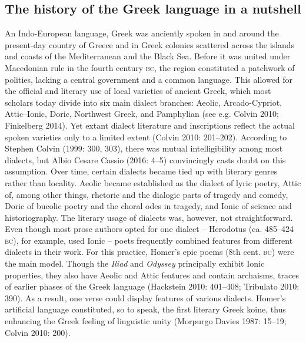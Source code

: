 \subsection{The history of the Greek language in a nutshell}
\hypertarget{Toc19704803}{}\begin{styleStandard}
An Indo-European language, Greek was anciently spoken in and around the present-day country of Greece and in Greek colonies scattered across the islands and coasts of the Mediterranean and the Black Sea. Before it was united under Macedonian rule in the fourth century \textsc{bc}, the region constituted a patchwork of polities, lacking a central government and a common language. This allowed for the official and literary use of local varieties of ancient Greek, which most scholars today divide into six main dialect branches: Aeolic, Arcado-Cypriot, Attic–Ionic, Doric, Northwest Greek, and Pamphylian (see e.g. Colvin 2010; Finkelberg 2014). Yet extant dialect literature and inscriptions reflect the actual spoken varieties only to a limited extent (Colvin 2010: 201–202). According to Stephen Colvin (1999: 300, 303), there was mutual intelligibility among most dialects, but Albio Cesare Cassio (2016: 4–5) convincingly casts doubt on this assumption. Over time, certain dialects became tied up with literary genres rather than locality. Aeolic became established as the dialect of lyric poetry, Attic of, among other things, rhetoric and the dialogic parts of tragedy and comedy, Doric of bucolic poetry and the choral odes in tragedy, and Ionic of science and historiography. The literary usage of dialects was, however, not straightforward. Even though most prose authors opted for one dialect – Herodotus (ca. 485–424 \textsc{bc}), for example, used Ionic – poets frequently combined features from different dialects in their work. For this practice, Homer’s epic poems (8th cent. \textsc{bc}) were the main model. Though the \textit{Iliad} and \textit{Odyssey} principally exhibit Ionic properties, they also have Aeolic and Attic features and contain archaisms, traces of earlier phases of the Greek language (Hackstein 2010: 401–408; Tribulato 2010: 390). As a result, one verse could display features of various dialects. Homer’s artificial language\textit{ }constituted, so to speak, the first literary Greek koine, thus enhancing the Greek feeling of linguistic unity (Morpurgo Davies 1987: 15–19; Colvin 2010: 200).
\end{styleStandard}

